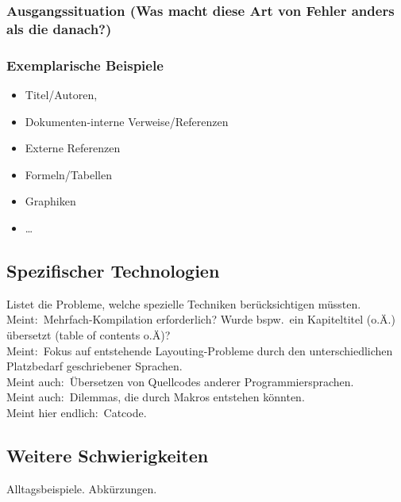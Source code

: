 \subsubsection{Ausgangssituation (Was macht diese Art von Fehler anders als die danach?)}
\subsubsection{Exemplarische Beispiele}
\begin{itemize}
    \item Titel/Autoren,
    \item Dokumenten-interne Verweise/Referenzen
    \item Externe Referenzen
    \item Formeln/Tabellen
    \item Graphiken
    \item \ldots
\end{itemize}

\subsection{Spezifischer Technologien}
Listet die Probleme, welche spezielle Techniken berücksichtigen müssten.\\
Meint:\ Mehrfach-Kompilation erforderlich? Wurde bspw.\ ein Kapiteltitel (o.Ä.) übersetzt (table of contents o.Ä)?\\
Meint:\ Fokus auf entstehende Layouting-Probleme durch den unterschiedlichen Platzbedarf geschriebener Sprachen.\\
Meint auch:\ Übersetzen von Quellcodes anderer Programmiersprachen.\\
Meint auch:\ Dilemmas, die durch Makros entstehen könnten.\\
Meint hier endlich:\ Catcode.\\

\subsection{Weitere Schwierigkeiten}
Alltagsbeispiele. Abkürzungen. 